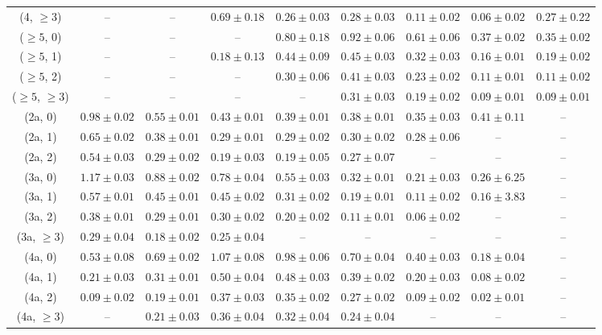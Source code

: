 \begin{table}[h!]
{\begin{tabular}{ccccccccc}
	(4, $\ge3$) & -- & -- & $0.69\pm 0.18$ & $0.26\pm 0.03$ & $0.28\pm 0.03$ & $0.11\pm 0.02$ & $0.06\pm 0.02$ & $0.27\pm 0.22$ \\[0.5ex] 
	($\ge5$, 0) & -- & -- & -- & $0.80\pm 0.18$ & $0.92\pm 0.06$ & $0.61\pm 0.06$ & $0.37\pm 0.02$ & $0.35\pm 0.02$ \\[0.5ex] 
	($\ge5$, 1) & -- & -- & $0.18\pm 0.13$ & $0.44\pm 0.09$ & $0.45\pm 0.03$ & $0.32\pm 0.03$ & $0.16\pm 0.01$ & $0.19\pm 0.02$ \\[0.5ex] 
	($\ge5$, 2) & -- & -- & -- & $0.30\pm 0.06$ & $0.41\pm 0.03$ & $0.23\pm 0.02$ & $0.11\pm 0.01$ & $0.11\pm 0.02$ \\[0.5ex] 
	($\ge5$, $\ge3$) & -- & -- & -- & -- & $0.31\pm 0.03$ & $0.19\pm 0.02$ & $0.09\pm 0.01$ & $0.09\pm 0.01$ \\[0.5ex] 
	(2a, 0) & $0.98\pm 0.02$ & $0.55\pm 0.01$ & $0.43\pm 0.01$ & $0.39\pm 0.01$ & $0.38\pm 0.01$ & $0.35\pm 0.03$ & $0.41\pm 0.11$ & -- \\[0.5ex] 
	(2a, 1) & $0.65\pm 0.02$ & $0.38\pm 0.01$ & $0.29\pm 0.01$ & $0.29\pm 0.02$ & $0.30\pm 0.02$ & $0.28\pm 0.06$ & -- & -- \\[0.5ex] 
	(2a, 2) & $0.54\pm 0.03$ & $0.29\pm 0.02$ & $0.19\pm 0.03$ & $0.19\pm 0.05$ & $0.27\pm 0.07$ & -- & -- & -- \\[0.5ex] 
	(3a, 0) & $1.17\pm 0.03$ & $0.88\pm 0.02$ & $0.78\pm 0.04$ & $0.55\pm 0.03$ & $0.32\pm 0.01$ & $0.21\pm 0.03$ & $0.26\pm 6.25$ & -- \\[0.5ex] 
	(3a, 1) & $0.57\pm 0.01$ & $0.45\pm 0.01$ & $0.45\pm 0.02$ & $0.31\pm 0.02$ & $0.19\pm 0.01$ & $0.11\pm 0.02$ & $0.16\pm 3.83$ & -- \\[0.5ex] 
	(3a, 2) & $0.38\pm 0.01$ & $0.29\pm 0.01$ & $0.30\pm 0.02$ & $0.20\pm 0.02$ & $0.11\pm 0.01$ & $0.06\pm 0.02$ & -- & -- \\[0.5ex] 
	(3a, $\ge3$) & $0.29\pm 0.04$ & $0.18\pm 0.02$ & $0.25\pm 0.04$ & -- & -- & -- & -- & -- \\[0.5ex] 
	(4a, 0) & $0.53\pm 0.08$ & $0.69\pm 0.02$ & $1.07\pm 0.08$ & $0.98\pm 0.06$ & $0.70\pm 0.04$ & $0.40\pm 0.03$ & $0.18\pm 0.04$ & -- \\[0.5ex] 
	(4a, 1) & $0.21\pm 0.03$ & $0.31\pm 0.01$ & $0.50\pm 0.04$ & $0.48\pm 0.03$ & $0.39\pm 0.02$ & $0.20\pm 0.03$ & $0.08\pm 0.02$ & -- \\[0.5ex] 
	(4a, 2) & $0.09\pm 0.02$ & $0.19\pm 0.01$ & $0.37\pm 0.03$ & $0.35\pm 0.02$ & $0.27\pm 0.02$ & $0.09\pm 0.02$ & $0.02\pm 0.01$ & -- \\[0.5ex] 
	(4a, $\ge3$) & -- & $0.21\pm 0.03$ & $0.36\pm 0.04$ & $0.32\pm 0.04$ & $0.24\pm 0.04$ & -- & -- & -- \\[0.5ex] 

\end{tabular}}
\end{table}
